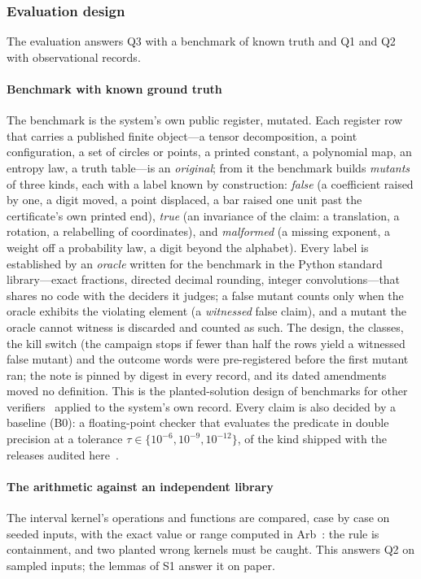 \documentclass[preprint,11pt,a4paper]{elsarticle}
\theoremstyle{definition}
\newcommand{\supp}[1]{S#1}
\begin{document}
\subsubsection{Evaluation design}\label{sec:evaluation}
The evaluation answers Q3 with a benchmark of known truth and Q1 and Q2 with observational records.

\paragraph{Benchmark with known ground truth}
The benchmark is the system's own public register, mutated. Each register row that carries a published finite object---a tensor decomposition, a point configuration, a set of circles or points, a printed constant, a polynomial map, an entropy law, a truth table---is an \emph{original}; from it the benchmark builds \emph{mutants} of three kinds, each with a label known by construction: \emph{false} (a coefficient raised by one, a digit moved, a point displaced, a bar raised one unit past the certificate's own printed end), \emph{true} (an invariance of the claim: a translation, a rotation, a relabelling of coordinates), and \emph{malformed} (a missing exponent, a weight off a probability law, a digit beyond the alphabet). Every label is established by an \emph{oracle} written for the benchmark in the Python standard library---exact fractions, directed decimal rounding, integer convolutions---that shares no code with the deciders it judges; a false mutant counts only when the oracle exhibits the violating element (a \emph{witnessed} false claim), and a mutant the oracle cannot witness is discarded and counted as such. The design, the classes, the kill switch (the campaign stops if fewer than half the rows yield a witnessed false mutant) and the outcome words were pre-registered before the first mutant ran; the note is pinned by digest in every record, and its \MtSaAmendments{} dated amendments moved no definition. This is the planted-solution design of benchmarks for other verifiers~\citep{Troxell26} applied to the system's own record. Every claim is also decided by a baseline (B0): a floating-point checker that evaluates the predicate in double precision at a tolerance $\tau\in\{10^{-6},10^{-9},10^{-12}\}$, of the kind shipped with the releases audited here~\citep{Yang26,OptConst}.

\paragraph{The arithmetic against an independent library}
The interval kernel's operations and functions are compared, case by case on seeded inputs, with the exact value or range computed in Arb~\citep{Johansson17}: the rule is containment, and two planted wrong kernels must be caught. This answers Q2 on sampled inputs; the lemmas of \supp{1} answer it on paper.
\end{document}
